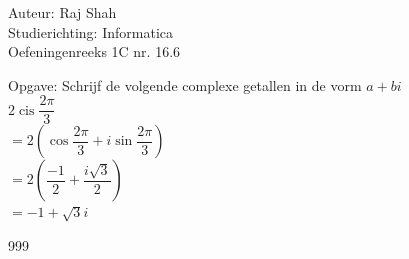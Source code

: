 \documentclass[a4paper]{article}
\begin{document}
  
\noindent \large Auteur: Raj Shah \\
\noindent \large Studierichting:  Informatica\\
\noindent \large Oefeningenreeks 1C nr. 16.6\\

\medskip
\normalsize

Opgave: Schrijf de volgende complexe getallen in de vorm $a + bi$\\

$ 2 \operatorname{cis}  \dfrac{2\pi} {3}$ \\


$ = 2 \left(\cos \dfrac{2\pi}{3} + i\sin \dfrac{2\pi}{3}\right)$\\

$ = 2 \left(\dfrac{-1}{2} + \dfrac{i \sqrt{3}}{2}\right)$\\

$ = -1 + \sqrt{3}i$\\

\begin{thebibliography}{999}
\end{thebibliography}
\end{document}
